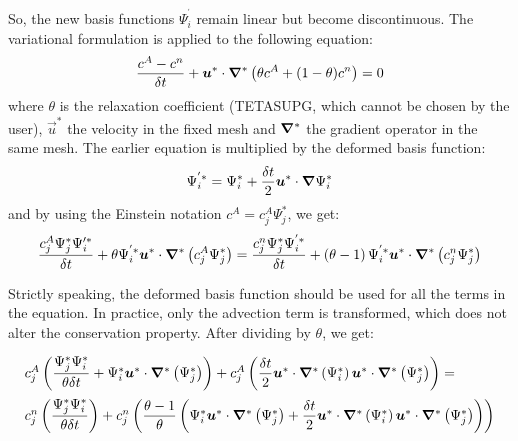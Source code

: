 So, the new basis functions $\Psi_{i}^{^{\prime}}$ remain linear but become
discontinuous. The variational formulation is applied to the following equation:%
\begin{equation}
\dfrac{c^{A}-c^{n}}{\delta t}+\bm{u}^{\ast}\cdot\bm{\nabla}^{\ast}\left(\theta c^{A}+(1-\theta)c^{n}\right)=0
\end{equation}
where $\theta$ is the relaxation coefficient (TETASUPG, which cannot be chosen by the user),
$\vec{u}^{\ast}$ the velocity in the fixed mesh and $\bm{\nabla}^{\ast}$ the gradient
operator in the same mesh. The earlier equation is multiplied by the deformed
basis function:%
\begin{equation}
\Psi_{i}^{^{\prime}\ast}=\Psi_{i}^{\ast}+\dfrac{\delta t}{2}\vec{u}%
^{\ast}\cdot\Grad \Psi_{i}^{\ast} \label{baseupwind}%
\end{equation}
and by using the Einstein notation $c^{A}=c_{j}^{A}\Psi_{j}^{\ast}$, we get:%
\begin{equation}
\dfrac{c_{j}^{A}\Psi_{j}^{\ast}\Psi_{i}^{\prime\ast}}{\delta t}+\theta\Psi_{i}^{^{\prime}\ast}
\bm{u}^{\ast}\cdot\bm{\nabla}^{\ast}\left( c_{j}^{A}\Psi_{j}^{\ast}\right) = 
\dfrac{c_{j}^{n}\Psi_{j}^{\ast}\Psi_{i}^{^{\prime}\ast}}{\delta t}+\left(\theta-1\right)
\Psi_{i}^{^{\prime}\ast}\bm{u}^{\ast}\cdot\bm{\nabla}^{\ast}\left(c_{j}^{n}\Psi_{j}^{\ast}\right)
\end{equation}

Strictly speaking, the deformed basis function should be used for all the
terms in the equation. In practice, only the advection term is transformed,
which does not alter the conservation property. After dividing by $\theta$, we get:%

\begin{equation}
\begin{array}{l}
c_{j}^{A}\left(\dfrac{\Psi_{j}^{\ast}\Psi_{i}^{\ast}}{\theta\delta t}+\Psi_{i}^{\ast}\vec{u}^{\ast}\cdot
\Grad^{\ast}\left(\Psi_{j}^{\ast}\right)  \right)
+c_{j}^{A}\left(\dfrac{\delta t}{2}\vec{u}^{\ast} \cdot\Grad^{\ast}\left(  \Psi_{i}^{\ast}\right)
\vec{u}^{\ast}\cdot\Grad^{\ast}\left(\Psi_{j}^{\ast}\right)  \right) = \medskip\\
c_{j}^{n}\left(\dfrac{\Psi_{j}^{\ast}\Psi_{i}^{\ast}}{\theta\delta t}\right)
+c_{j}^{n}\left(  \dfrac{\theta-1}{\theta}\left(  \Psi_{i}^{\ast}\vec{u}^{\ast}\cdot
\Grad^{\ast}\left(  \Psi_{j}^{\ast}\right)  +\dfrac{\delta t}{2}\vec{u}^{\ast}\cdot\Grad^{\ast}
\left(  \Psi_{i}^{\ast}\right)  \vec{u}^{\ast}\cdot\Grad^{\ast}\left(  \Psi_{j}^{\ast}\right)  \right)
\right)\\
\end{array}
\end{equation}
%

